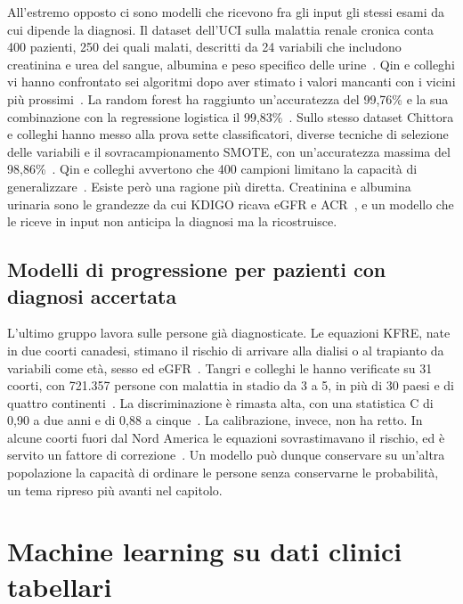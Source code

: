 \documentclass[a4paper, 12pt, oneside]{book}
\begin{document}
All'estremo opposto ci sono modelli che ricevono fra gli input gli stessi esami da cui dipende la diagnosi. Il dataset dell'UCI sulla malattia renale cronica conta 400 pazienti, 250 dei quali malati, descritti da 24 variabili che includono creatinina e urea del sangue, albumina e peso specifico delle urine~\cite{l_rubini_chronic_2015,qin_machine_2020}. Qin e colleghi vi hanno confrontato sei algoritmi dopo aver stimato i valori mancanti con i vicini più prossimi~\cite{qin_machine_2020}. La random forest ha raggiunto un'accuratezza del 99,76\% e la sua combinazione con la regressione logistica il 99,83\%~\cite{qin_machine_2020}. Sullo stesso dataset Chittora e colleghi hanno messo alla prova sette classificatori, diverse tecniche di selezione delle variabili e il sovracampionamento SMOTE, con un'accuratezza massima del 98,86\%~\cite{chittora_prediction_2021}. Qin e colleghi avvertono che 400 campioni limitano la capacità di generalizzare~\cite{qin_machine_2020}. Esiste però una ragione più diretta. Creatinina e albumina urinaria sono le grandezze da cui KDIGO ricava eGFR e ACR~\cite{stevens_kdigo_2024}, e un modello che le riceve in input non anticipa la diagnosi ma la ricostruisce.

\subsection{Modelli di progressione per pazienti con diagnosi accertata}

L'ultimo gruppo lavora sulle persone già diagnosticate. Le equazioni KFRE, nate in due coorti canadesi, stimano il rischio di arrivare alla dialisi o al trapianto da variabili come età, sesso ed eGFR~\cite{tangri_multinational_2016}. Tangri e colleghi le hanno verificate su 31 coorti, con 721.357 persone con malattia in stadio da 3 a 5, in più di 30 paesi e di quattro continenti~\cite{tangri_multinational_2016}. La discriminazione è rimasta alta, con una statistica C di 0,90 a due anni e di 0,88 a cinque~\cite{tangri_multinational_2016}. La calibrazione, invece, non ha retto. In alcune coorti fuori dal Nord America le equazioni sovrastimavano il rischio, ed è servito un fattore di correzione~\cite{tangri_multinational_2016}. Un modello può dunque conservare su un'altra popolazione la capacità di ordinare le persone senza conservarne le probabilità, un tema ripreso più avanti nel capitolo.

\section{Machine learning su dati clinici tabellari}
\end{document}
